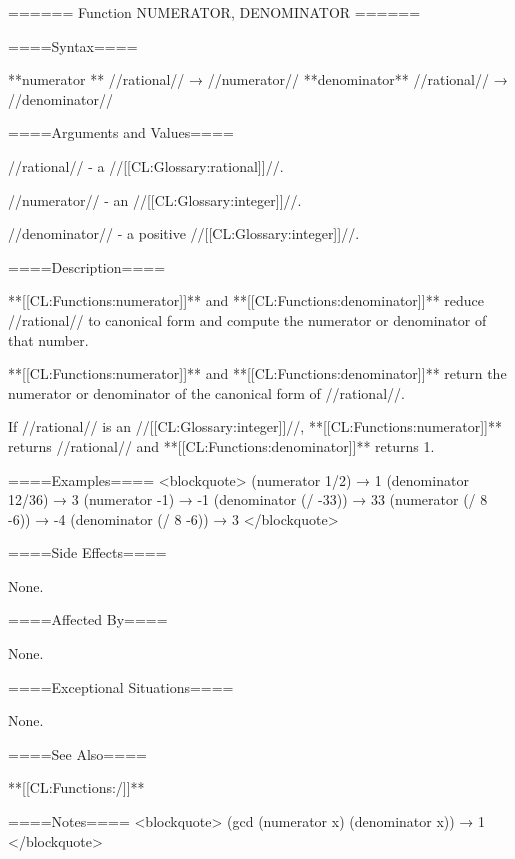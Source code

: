 ====== Function NUMERATOR, DENOMINATOR ======

====Syntax====

**numerator ** //rational// → //numerator// **denominator** //rational// → //denominator//

====Arguments and Values====

//rational// - a //[[CL:Glossary:rational]]//.

//numerator// - an //[[CL:Glossary:integer]]//.

//denominator// - a positive //[[CL:Glossary:integer]]//.

====Description====

**[[CL:Functions:numerator]]** and **[[CL:Functions:denominator]]** reduce //rational// to canonical form and compute the numerator or denominator of that number.

**[[CL:Functions:numerator]]** and **[[CL:Functions:denominator]]** return the numerator or denominator of the canonical form of //rational//.

If //rational// is an //[[CL:Glossary:integer]]//, **[[CL:Functions:numerator]]** returns //rational// and **[[CL:Functions:denominator]]** returns 1.

====Examples==== <blockquote> (numerator 1/2) → 1 (denominator 12/36) → 3 (numerator -1) → -1 (denominator (/ -33)) → 33 (numerator (/ 8 -6)) → -4 (denominator (/ 8 -6)) → 3 </blockquote>

====Side Effects====

None.

====Affected By====

None.

====Exceptional Situations====

None.

====See Also====

**[[CL:Functions:/]]**

====Notes==== <blockquote> (gcd (numerator x) (denominator x)) → 1 </blockquote>

